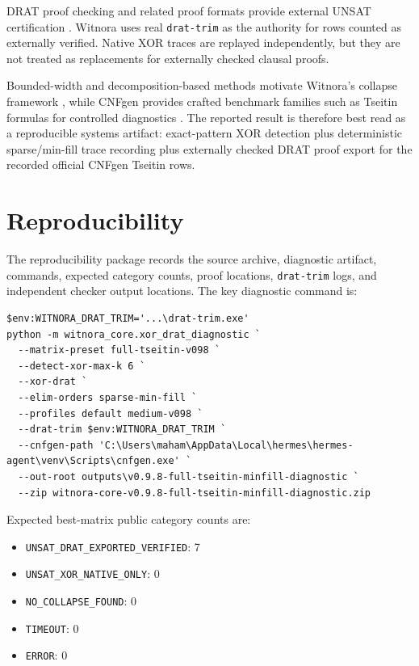 \documentclass[10pt]{article}
\begin{document}
DRAT proof checking and related proof formats provide external UNSAT
certification \cite{wetzler2014drattrim,heule2016drat}. Witnora uses real
\texttt{drat-trim} as the authority for rows counted as externally verified.
Native XOR traces are replayed independently, but they are not treated as
replacements for externally checked clausal proofs.

Bounded-width and decomposition-based methods motivate Witnora's collapse
framework \cite{gottlob2002hypertree,samer2010boundedtreewidth}, while CNFgen
provides crafted benchmark families such as Tseitin formulas for controlled
diagnostics \cite{cnfgen}. The reported result is therefore best read as a
reproducible systems artifact: exact-pattern XOR detection plus deterministic
sparse/min-fill trace recording plus externally checked DRAT proof export for
the recorded official CNFgen Tseitin rows.

\section{Reproducibility}

The reproducibility package records the source archive, diagnostic artifact,
commands, expected category counts, proof locations, \texttt{drat-trim} logs,
and independent checker output locations. The key diagnostic command is:

\begin{verbatim}
$env:WITNORA_DRAT_TRIM='...\drat-trim.exe'
python -m witnora_core.xor_drat_diagnostic `
  --matrix-preset full-tseitin-v098 `
  --detect-xor-max-k 6 `
  --xor-drat `
  --elim-orders sparse-min-fill `
  --profiles default medium-v098 `
  --drat-trim $env:WITNORA_DRAT_TRIM `
  --cnfgen-path 'C:\Users\maham\AppData\Local\hermes\hermes-agent\venv\Scripts\cnfgen.exe' `
  --out-root outputs\v0.9.8-full-tseitin-minfill-diagnostic `
  --zip witnora-core-v0.9.8-full-tseitin-minfill-diagnostic.zip
\end{verbatim}

Expected best-matrix public category counts are:
\begin{itemize}
  \item \texttt{UNSAT\_DRAT\_EXPORTED\_VERIFIED}: 7
  \item \texttt{UNSAT\_XOR\_NATIVE\_ONLY}: 0
  \item \texttt{NO\_COLLAPSE\_FOUND}: 0
  \item \texttt{TIMEOUT}: 0
  \item \texttt{ERROR}: 0
\end{itemize}
\end{document}
